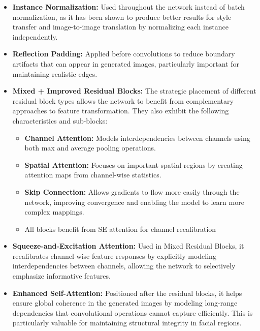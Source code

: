 \documentclass[twoside,english,notitlepage]{report}
\begin{document}
\begin{itemize}
    \item \textbf{Instance Normalization:} Used throughout the network instead of batch normalization, as it has been shown to produce better results for style transfer and image-to-image translation by normalizing each instance independently.

    \item \textbf{Reflection Padding:} Applied before convolutions to reduce boundary artifacts that can appear in generated images, particularly important for maintaining realistic edges.

    \item \textbf{Mixed + Improved Residual Blocks:} The strategic placement of different residual block types allows the network to benefit from complementary approaches to feature transformation. They also exhibit the following characteristics and sub-blocks:
    \begin{itemize}
        \item \textbf{Channel Attention:} Models interdependencies between channels using both max and average pooling operations.
        \item \textbf{Spatial Attention:} Focuses on important spatial regions by creating attention maps from channel-wise statistics.
        \item \textbf{Skip Connection:} Allows gradients to flow more easily through the network, improving convergence and enabling the model to learn more complex mappings.
        \item All blocks benefit from SE attention for channel recalibration
    \end{itemize}

    \item \textbf{Squeeze-and-Excitation Attention:} Used in Mixed Residual Blocks, it recalibrates channel-wise feature responses by explicitly modeling interdependencies between channels, allowing the network to selectively emphasize informative features.

    \item \textbf{Enhanced Self-Attention:} Positioned after the residual blocks, it helps ensure global coherence in the generated images by modeling long-range dependencies that convolutional operations cannot capture efficiently. This is particularly valuable for maintaining structural integrity in facial regions.

\end{itemize}
\end{document}
